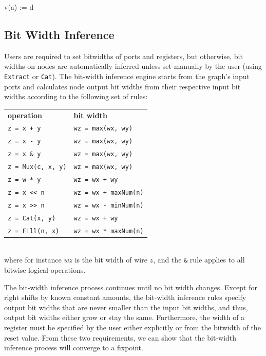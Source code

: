 \documentclass[10pt,twocolumn]{article}
\def\code#1{{\small\tt #1}}
\begin{document}
\begin{scala}
v(a) := d
\end{scala}


\subsection{Bit Width Inference}

Users are required to set bitwidths of ports and registers, but otherwise,
bit widths on nodes are automatically inferred unless set manually by
the user (using \code{Extract} or \code{Cat}).
The bit-width inference engine starts from the graph's input ports and 
calculates node output bit widths from their respective input bit widths according to the following set of rules:\\[-2mm]

{\small
\begin{tabular}{ll}
{\bf operation} & {\bf bit width} \\ 
\verb|z = x + y| & \verb+wz = max(wx, wy)+ \\
\verb+z = x - y+ & \verb+wz = max(wx, wy)+\\
\verb+z = x & y+ & \verb+wz = max(wx, wy)+ \\
\verb+z = Mux(c, x, y)+ & \verb+wz = max(wx, wy)+ \\
\verb+z = w * y+ & \verb!wz = wx + wy! \\
\verb+z = x << n+ & \verb!wz = wx + maxNum(n)! \\
\verb+z = x >> n+ & \verb+wz = wx - minNum(n)+ \\
\verb+z = Cat(x, y)+ & \verb!wz = wx + wy! \\
\verb+z = Fill(n, x)+ & \verb+wz = wx * maxNum(n)+ \\
\end{tabular}
}
\\[1mm]
\noindent  
where for instance $wz$ is the bit width of wire $z$, and the \verb+&+
rule applies to all bitwise logical operations.

The bit-width inference process continues until no bit width changes.
Except for right shifts by known constant amounts, the bit-width
inference rules specify output bit widths that are never smaller than
the input bit widths, and thus, output bit widths either grow or stay
the same.  Furthermore, the width of a register must be specified by
the user either explicitly or from the bitwidth of the reset value.
From these two requirements, we can show that the bit-width inference
process will converge to a fixpoint.
\end{document}
